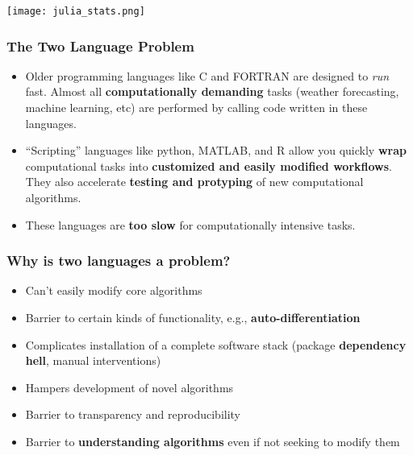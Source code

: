 \documentclass[t]{beamer}
\newcommand\df{\bf\color{Maroon}}
\begin{document}


\begin{frame}[plain]
     \texttt{[image: julia\_stats.png]}
\end{frame}




\begin{frame}
  \frametitle{The Two Language Problem}
  \begin{itemize}

\item   Older programming languages like C and FORTRAN are designed to {\em
    run} fast. Almost all {\df computationally demanding} tasks
  (weather forecasting, machine learning, etc) are performed by
  calling code written in these languages. \pause
  
\item ``Scripting'' languages like python, MATLAB, and R allow you
  quickly {\df wrap} computational tasks into {\df customized and easily
    modified workflows}. They also accelerate {\df testing and
    protyping} of new computational algorithms.\pause

\item These languages are {\df too slow} for computationally intensive tasks.
\end{itemize}
\end{frame}


  
\begin{frame}
  \frametitle{Why  is two languages a problem?}
  \begin{itemize}
    \item Can't easily modify core algorithms
    \item Barrier to certain kinds of functionality, e.g., {\df auto-differentiation}
    \item Complicates installation of a complete software stack
    (package {\df dependency hell}, manual interventions)
  \item Hampers development of novel algorithms
  \item Barrier to transparency and reproducibility
  \item Barrier to {\df understanding algorithms} even if not seeking to modify them
  \end{itemize}
\end{frame}
\end{document}
